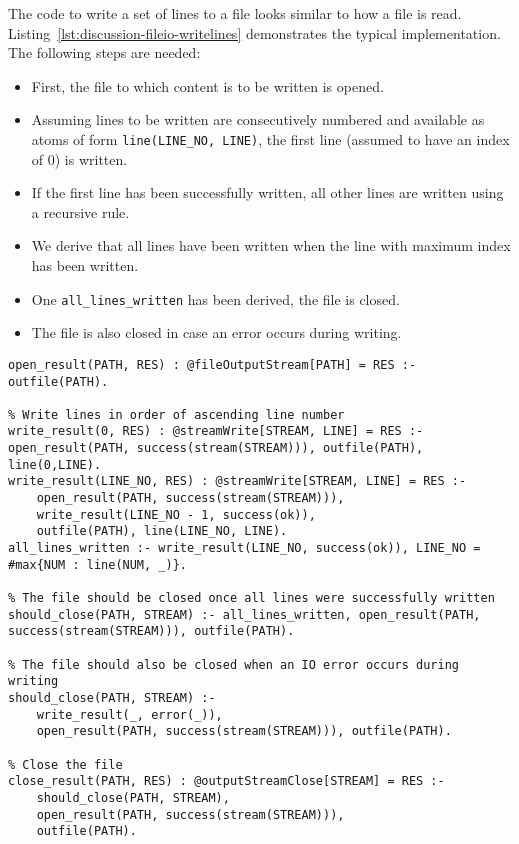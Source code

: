 The code to write a set of lines to a file looks similar to how a file is read. Listing~\ref{lst:discussion-fileio-writelines} demonstrates the typical implementation. The following steps are needed:
\begin{itemize}
	\item First, the file to which content is to be written is opened.
	\item Assuming lines to be written are consecutively numbered and available as atoms of form \texttt{line(LINE\_NO, LINE)}, the first line (assumed to have an index of 0) is written.
	\item If the first line has been successfully written, all other lines are written using a recursive rule.
	\item We derive that all lines have been written when the line with maximum index has been written.
	\item One \texttt{all\_lines\_written} has been derived, the file is closed.
	\item The file is also closed in case an error occurs during writing.
\end{itemize}	

\begin{lstlisting}[style=asp-code, label={lst:discussion-fileio-writelines}, caption={Writing lines to a file.}]
% Open the output file
open_result(PATH, RES) : @fileOutputStream[PATH] = RES :- outfile(PATH).

% Write lines in order of ascending line number
write_result(0, RES) : @streamWrite[STREAM, LINE] = RES :- open_result(PATH, success(stream(STREAM))), outfile(PATH), line(0,LINE).
write_result(LINE_NO, RES) : @streamWrite[STREAM, LINE] = RES :-  
	open_result(PATH, success(stream(STREAM))), 
	write_result(LINE_NO - 1, success(ok)), 
	outfile(PATH), line(LINE_NO, LINE).
all_lines_written :- write_result(LINE_NO, success(ok)), LINE_NO = #max{NUM : line(NUM, _)}.
	
% The file should be closed once all lines were successfully written	
should_close(PATH, STREAM) :- all_lines_written, open_result(PATH, success(stream(STREAM))), outfile(PATH).

% The file should also be closed when an IO error occurs during writing
should_close(PATH, STREAM) :- 
	write_result(_, error(_)),
	open_result(PATH, success(stream(STREAM))), outfile(PATH).

% Close the file
close_result(PATH, RES) : @outputStreamClose[STREAM] = RES :- 
	should_close(PATH, STREAM), 
	open_result(PATH, success(stream(STREAM))), 
	outfile(PATH).
\end{lstlisting}	

